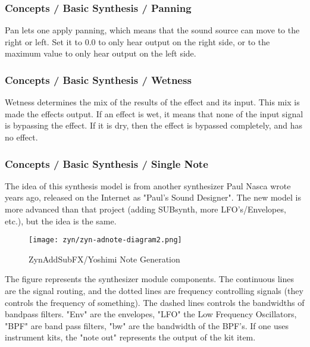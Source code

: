 \subsubsection{Concepts / Basic Synthesis / Panning}
\label{subsubsec:concepts_basics_panning}

   Pan lets one apply panning, which means that the sound source can move to
   the right or left. Set it to 0.0 to only hear output on the right side, or
   to the maximum value to only hear output on the left side.

\subsubsection{Concepts / Basic Synthesis / Wetness}
\label{subsubsec:concepts_basics_wetness}

   Wetness determines the mix of the results of the effect and its input.
   This mix is made the effects output. If an effect is wet, it means that
   none of the input signal is bypassing the effect. If it is dry, then
   the effect is bypassed completely, and has no effect.

\subsubsection{Concepts / Basic Synthesis / Single Note}
\label{subsubsec:concepts_basics_single_note}

   The idea of this synthesis model is from another synthesizer Paul Nasca
   wrote years ago, released on the Internet as "Paul's Sound
   Designer".  The new model is more advanced than that project
   (adding SUBsynth, more LFO's/Envelopes, etc.), but the idea is
   the same.

\begin{figure}[H]
   \centering 
   \texttt{[image: zyn/zyn-adnote-diagram2.png]}
   \caption{ZynAddSubFX/Yoshimi Note Generation}
   \label{fig:zynaddsubfx_note_generation}
\end{figure}
   
   The figure represents the synthesizer module components. The continuous
   lines are the signal routing, and the dotted lines are frequency
   controlling signals (they controls the frequency of something).  The
   dashed lines controls the bandwidths of bandpass filters. "Env" are the
   envelopes, "LFO" the Low Frequency Oscillators, "BPF" are band pass
   filters, "bw" are the bandwidth of the BPF's.  If one uses instrument kits,
   the "note out" represents the output of the kit item.

